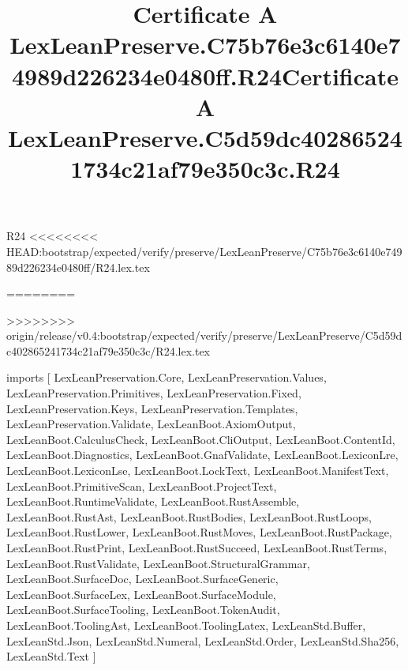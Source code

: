 \begin{lexlean}{R24}
<<<<<<<< HEAD:bootstrap/expected/verify/preserve/LexLeanPreserve/C75b76e3c6140e74989d226234e0480ff/R24.lex.tex
\title{Certificate A LexLeanPreserve.C75b76e3c6140e74989d226234e0480ff.R24}
========
\title{Certificate A LexLeanPreserve.C5d59dc402865241734c21af79e350c3c.R24}
>>>>>>>> origin/release/v0.4:bootstrap/expected/verify/preserve/LexLeanPreserve/C5d59dc402865241734c21af79e350c3c/R24.lex.tex
\begin{coremodule}
imports [
  LexLeanPreservation.Core,
  LexLeanPreservation.Values,
  LexLeanPreservation.Primitives,
  LexLeanPreservation.Fixed,
  LexLeanPreservation.Keys,
  LexLeanPreservation.Templates,
  LexLeanPreservation.Validate,
  LexLeanBoot.AxiomOutput,
  LexLeanBoot.CalculusCheck,
  LexLeanBoot.CliOutput,
  LexLeanBoot.ContentId,
  LexLeanBoot.Diagnostics,
  LexLeanBoot.GnafValidate,
  LexLeanBoot.LexiconLre,
  LexLeanBoot.LexiconLse,
  LexLeanBoot.LockText,
  LexLeanBoot.ManifestText,
  LexLeanBoot.PrimitiveScan,
  LexLeanBoot.ProjectText,
  LexLeanBoot.RuntimeValidate,
  LexLeanBoot.RustAssemble,
  LexLeanBoot.RustAst,
  LexLeanBoot.RustBodies,
  LexLeanBoot.RustLoops,
  LexLeanBoot.RustLower,
  LexLeanBoot.RustMoves,
  LexLeanBoot.RustPackage,
  LexLeanBoot.RustPrint,
  LexLeanBoot.RustSucceed,
  LexLeanBoot.RustTerms,
  LexLeanBoot.RustValidate,
  LexLeanBoot.StructuralGrammar,
  LexLeanBoot.SurfaceDoc,
  LexLeanBoot.SurfaceGeneric,
  LexLeanBoot.SurfaceLex,
  LexLeanBoot.SurfaceModule,
  LexLeanBoot.SurfaceTooling,
  LexLeanBoot.TokenAudit,
  LexLeanBoot.ToolingAst,
  LexLeanBoot.ToolingLatex,
  LexLeanStd.Buffer,
  LexLeanStd.Json,
  LexLeanStd.Numeral,
  LexLeanStd.Order,
  LexLeanStd.Sha256,
  LexLeanStd.Text
]


\end{coremodule}
\end{lexlean}
